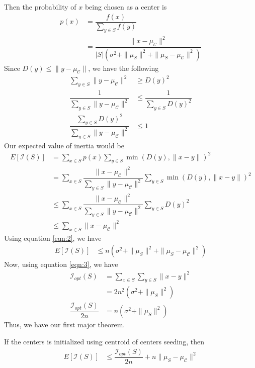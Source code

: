 \documentclass[twoside, 11pt]{article}
\newcommand{\C}{\mathcal{C}}
\newcommand{\I}{\mathcal{I}}
\begin{document}
	Then the probability of $x$ being chosen as a center is
		\begin{align*}
			p(x) & = \dfrac{f(x)}{\sum_{y\in S}f(y)}\\
				 & = \dfrac{\|x-\mu_{\C}\|^2}{|S|(\sigma^2+\|\mu_S\|^2+\|\mu_{S}-\mu_{\C}\|^2)}
		\end{align*}
	Since $D(y)\leq \|y-\mu_{\C}\|$, we have the following
		\begin{align*}
			\sum_{y\in S}\|y-\mu_{\C}\|^2 & \geq D(y)^2\\
			\dfrac{1}{\sum_{y\in S}\|y-\mu_{\C}\|^2} & \leq \dfrac{1}{\sum_{y\in S}D(y)^2}\\
			\dfrac{\sum_{y\in S}D(y)^2}{\sum_{y\in S}\|y-\mu_{\C}\|^2} & \leq 1
		\end{align*}
	Our expected value of inertia would be
		\begin{align*}
			E[\I(S)] & = \sum_{x\in S}p(x)\sum_{y\in S}\min(D(y),\|x-y\|)^2\\
					   & = \sum_{x\in S}\dfrac{\|x-\mu_{\C}\|^2}{\sum_{y\in S}\|y-\mu_{\C}\|^2}\sum_{y\in S}\min(D(y),\|x-y\|)^2\\
					   & \leq \sum_{x\in S}\dfrac{\|x-\mu_{\C}\|^2}{\sum_{y\in S}\|y-\mu_{\C}\|^2}\sum_{y\in S}D(y)^2\\
					   & \leq \sum_{x\in S}\|x-\mu_{\C}\|^2
		\end{align*}
	Using equation \eqref{eqn:2}, we have
		\begin{align*}
			E[\I(S)] & \leq n(\sigma^2+\|\mu_S\|^2+\|\mu_S-\mu_{\C}\|^2)
		\end{align*}
	Now, using equation \eqref{eqn:3}, we have
		\begin{align*}
			\I_{opt}(S) & = \sum_{x\in S}\sum_{y\in S}\|x-y\|^2\\
						  & = 2n^2(\sigma^2+\|\mu_{S}\|^2)\\
			\dfrac{\I_{opt}(S)}{2n} & = n(\sigma^2+\|\mu_{S}\|^2)
		\end{align*}
	Thus, we have our first major theorem.
		\begin{theorem}
			If the centers is initialized using centroid of centers seeding, then
				\begin{align*}
					E[\I(S)] & \leq \dfrac{\I_{opt}(S)}{2n}+n\|\mu_{S}-\mu_{\C}\|^2
				\end{align*}
		\end{theorem}
				
\end{document}
